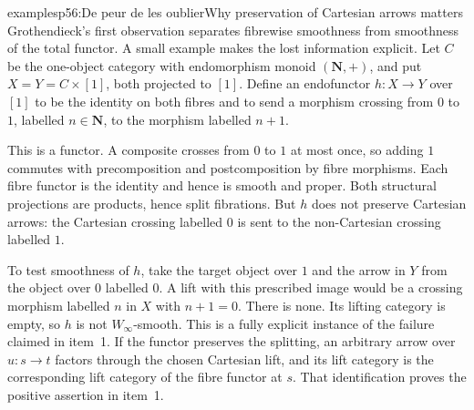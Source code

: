 \begin{dcomment}{examples}{p56:De peur de les oublier}{Why preservation of Cartesian arrows matters}
Grothendieck's first observation separates fibrewise smoothness from smoothness of the total functor. A small example makes the lost information explicit. Let $C$ be the one-object category with endomorphism monoid $(\mathbf N,+)$, and put $X=Y=C\times[1]$, both projected to $[1]$. Define an endofunctor $h:X\to Y$ over $[1]$ to be the identity on both fibres and to send a morphism crossing from $0$ to $1$, labelled $n\in\mathbf N$, to the morphism labelled $n+1$.

This is a functor. A composite crosses from $0$ to $1$ at most once, so adding $1$ commutes with precomposition and postcomposition by fibre morphisms. Each fibre functor is the identity and hence is smooth and proper. Both structural projections are products, hence split fibrations. But $h$ does not preserve Cartesian arrows: the Cartesian crossing labelled $0$ is sent to the non-Cartesian crossing labelled $1$.

To test smoothness of $h$, take the target object over $1$ and the arrow in $Y$ from the object over $0$ labelled $0$. A lift with this prescribed image would be a crossing morphism labelled $n$ in $X$ with $n+1=0$. There is none. Its lifting category is empty, so $h$ is not $W_\infty$-smooth. This is a fully explicit instance of the failure claimed in item~1. If the functor preserves the splitting, an arbitrary arrow over $u:s\to t$ factors through the chosen Cartesian lift, and its lift category is the corresponding lift category of the fibre functor at $s$. That identification proves the positive assertion in item~1.
\end{dcomment}

